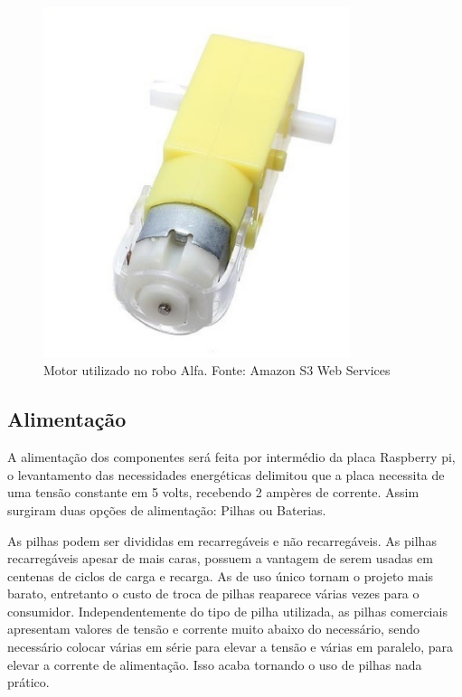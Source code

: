 \begin{figure}[H]
    \centering
    \includegraphics[width=0.8\textwidth]{figuras/motor.eps}
    \caption{Motor utilizado no robo Alfa. Fonte: Amazon S3 Web Services}
    \label{fig:motor}
\end{figure}

\subsection{Alimentação}

A alimentação dos componentes será feita por intermédio da placa Raspberry pi, o levantamento das necessidades energéticas delimitou que a placa necessita de uma tensão constante em 5 volts, recebendo 2 ampères de corrente.  Assim surgiram duas opções de alimentação: Pilhas ou Baterias.

As pilhas podem ser divididas em recarregáveis e não recarregáveis. As pilhas recarregáveis apesar de mais caras, possuem a vantagem de serem usadas em centenas de ciclos de carga e recarga. As de uso único tornam o projeto mais barato, entretanto o custo de troca de pilhas reaparece várias vezes para o consumidor. Independentemente do tipo de pilha utilizada, as pilhas comerciais apresentam valores de tensão e corrente muito abaixo do necessário, sendo necessário colocar várias em série para elevar a tensão e várias em paralelo, para elevar a corrente de alimentação. Isso acaba tornando o uso de pilhas nada prático.

